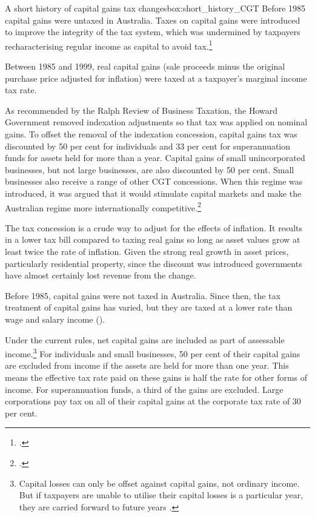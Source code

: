 \documentclass{grattan}\usepackage[]{graphicx}\usepackage[]{color}
\begin{document}
\begin{smallbox}{A short history of capital gains tax changes}{box:short_history_CGT}
Before 1985 capital gains were untaxed in Australia. Taxes on capital gains were introduced to improve the integrity of the tax system, which was undermined by taxpayers recharacterising regular income as capital to avoid tax.\footcites{Evans2005}{Kenny2005}

Between 1985 and 1999, real capital gains (sale proceeds minus the original purchase price adjusted for inflation) were taxed at a taxpayer's marginal income tax rate. 

As recommended by the Ralph Review of Business Taxation, the Howard Government removed indexation adjustments so that tax was applied on nominal gains. To offset the removal of the indexation concession, capital gains tax was discounted by 50 per cent for individuals and 33 per cent for superannuation funds for assets held for more than a year. Capital gains of small unincorporated businesses, but not large businesses, are also discounted by 50 per cent. Small businesses also receive a range of other CGT concessions. When this regime was introduced, it was argued that it would stimulate capital markets and make the Australian regime more internationally competitive.\footcite[p.~14, 598]{BusinessTaxation1999} 

The tax concession is a crude way to adjust for the effects of inflation. It results in a lower tax bill compared to taxing real gains so long as asset values grow at least twice the rate of inflation. Given the strong real growth in asset prices, particularly residential property, since the discount was introduced governments have almost certainly lost revenue from the change.

\end{smallbox}
Before 1985, capital gains were not taxed in Australia. Since then, the tax treatment of capital gains has varied, but they are taxed at a lower rate than wage and salary income ().  

Under the current rules, net capital gains are included as part of assessable income.\footnote{Capital losses can only be offset against capital gains, not ordinary income. But if taxpayers are unable to utilise their capital losses is a particular year, they are carried forward to future years \textcite{ATO2014a}.}  For individuals and small businesses, 50 per cent of their capital gains are excluded from income if the assets are held for more than one year. This means the effective tax rate paid on these gains is half the rate for other forms of income. For superannuation funds, a third of the gains are excluded. Large corporations pay tax on all of their capital gains at the corporate tax rate of 30 per cent.
\end{document}
